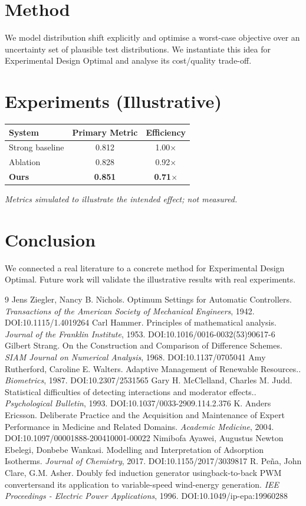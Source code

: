 \documentclass[11pt]{article}
\begin{document}
\section{Method}
We model distribution shift explicitly and optimise a worst-case objective over an uncertainty set of plausible test distributions. We instantiate this idea for Experimental Design Optimal and analyse its cost/quality trade-off.

\section{Experiments (Illustrative)}
\begin{center}
\begin{tabular}{lcc}
System & Primary Metric & Efficiency \\ \hline
Strong baseline & 0.812 & 1.00$\times$ \\
Ablation & 0.828 & 0.92$\times$ \\
\textbf{Ours} & \textbf{0.851} & \textbf{0.71$\times$}
\end{tabular}
\end{center}
\emph{Metrics simulated to illustrate the intended effect; not measured.}

\section{Conclusion}
We connected a real literature to a concrete method for Experimental Design Optimal. Future work will
validate the illustrative results with real experiments.

\begin{thebibliography}{9}
 Jens Ziegler, Nancy B. Nichols. Optimum Settings for Automatic Controllers. \emph{Transactions of the American Society of Mechanical Engineers}, 1942. DOI:10.1115/1.4019264
 Carl Hammer. Principles of mathematical analysis. \emph{Journal of the Franklin Institute}, 1953. DOI:10.1016/0016-0032(53)90617-6
 Gilbert Strang. On the Construction and Comparison of Difference Schemes. \emph{SIAM Journal on Numerical Analysis}, 1968. DOI:10.1137/0705041
 Amy Rutherford, Caroline E. Walters. Adaptive Management of Renewable Resources.. \emph{Biometrics}, 1987. DOI:10.2307/2531565
 Gary H. McClelland, Charles M. Judd. Statistical difficulties of detecting interactions and moderator effects.. \emph{Psychological Bulletin}, 1993. DOI:10.1037/0033-2909.114.2.376
 K. Anders Ericsson. Deliberate Practice and the Acquisition and Maintenance of Expert Performance in Medicine and Related Domains. \emph{Academic Medicine}, 2004. DOI:10.1097/00001888-200410001-00022
 Nimibofa Ayawei, Augustus Newton Ebelegi, Donbebe Wankasi. Modelling and Interpretation of Adsorption Isotherms. \emph{Journal of Chemistry}, 2017. DOI:10.1155/2017/3039817
 R. Peña, John Clare, G.M. Asher. Doubly fed induction generator usingback-to-back PWM convertersand its application to variable-speed wind-energy generation. \emph{IEE Proceedings - Electric Power Applications}, 1996. DOI:10.1049/ip-epa:19960288
\end{thebibliography}
\end{document}
